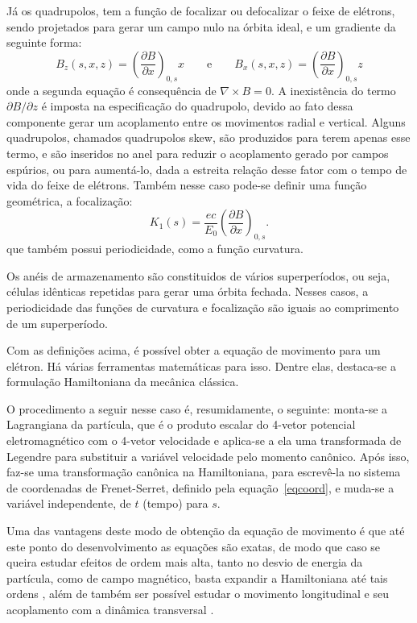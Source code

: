 Já os quadrupolos, tem a função de focalizar ou defocalizar o feixe de elétrons, sendo projetados para gerar um campo nulo na órbita ideal, e um gradiente da seguinte forma:
\begin{equation}
 B_z(s,x,z)=\left(\frac{\partial B}{\partial x}\right)_{0,s}x \qquad \mathrm{e}
\qquad B_x(s,x,z)=\left(\frac{\partial B}{\partial x}\right)_{0,s}z
\end{equation}
onde a segunda equação é consequência de $\nabla \times B = 0$. A inexistência do termo $\partial B / \partial z$ é imposta na especificação do quadrupolo, devido ao fato dessa componente gerar um acoplamento entre os movimentos radial e vertical.
Alguns quadrupolos, chamados quadrupolos skew, são produzidos para terem apenas esse termo, e são inseridos no anel para reduzir o acoplamento gerado por campos espúrios, ou para aumentá-lo, dada a estreita relação desse fator com o tempo de vida do feixe de elétrons.
Também nesse caso pode-se definir uma função geométrica, a focalização:
\begin{equation}
  K_1(s)=\frac{ec}{E_0}\left(\frac{\partial B}{\partial x}\right)_{0,s}.
\end{equation}
que também possui periodicidade, como a função curvatura.

Os anéis de armazenamento são constituidos de vários superperíodos, ou seja, células idênticas repetidas para gerar uma órbita fechada. Nesses casos, a periodicidade das funções de curvatura e focalização são iguais ao comprimento de um superperíodo.

Com as definições acima, é possível obter a equação de movimento para um elétron. Há várias ferramentas matemáticas para isso. Dentre elas, destaca-se a formulação Hamiltoniana da mecânica clássica.

O procedimento a seguir nesse caso é, resumidamente, o seguinte: monta-se a Lagrangiana da partícula, que é o produto escalar do 4-vetor potencial eletromagnético com o 4-vetor velocidade e aplica-se a ela uma transformada de Legendre para substituir a variável velocidade pelo momento canônico. Após isso, faz-se uma transformação canônica na Hamiltoniana, para escrevê-la no sistema de coordenadas de Frenet-Serret, definido pela \mbox{equação~\eqref{eqcoord}}, e muda-se a variável independente, de $t$
(tempo)
para $s$.

Uma das vantagens deste modo de obtenção da equação de movimento é que até este ponto do desenvolvimento as equações são exatas, de modo que caso se queira estudar efeitos de ordem mais alta, tanto no desvio de energia da partícula, como de campo magnético, basta expandir a Hamiltoniana até tais ordens \cite{Wiedemann2 II}, além de também ser possível estudar o movimento longitudinal e seu acoplamento com a dinâmica transversal \cite{Lee}.

